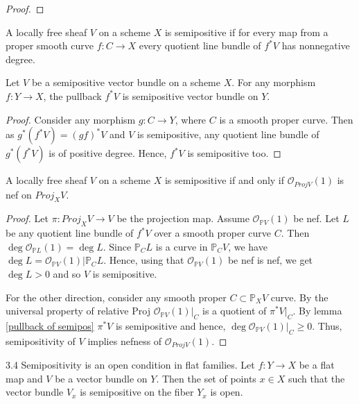 \begin{proof}

\end{proof}


\begin{definition}
A locally free sheaf $V$ on a scheme $X$ is semipositive if for every map from a proper smooth curve $f:C\to X$ every quotient line bundle of $f^*V$ has nonnegative degree.
\end{definition}

\begin{lemma}\label{pullback of semipos}
Let $V$ be a semipositive vector bundle on a scheme $X$. For any morphism $f:Y\to X$, the pullback $f^*V$ is semipositive vector bundle on $Y$.
\end{lemma}
\begin{proof}
Consider any morphism $g:C\to Y$, where $C$ is a smooth proper curve. Then as $g^*(f^*V)=(gf)^*V$ and $V$ is semipositive, any quotient line bundle of  $g^*(f^*V)$ is of positive degree. Hence, $f^*V$ is semipositive too.
\end{proof}

\begin{lemma}\label{semipos=nef}
A locally free sheaf $V$ on a scheme $X$ is semipositive if and only if $\mathcal{O}_{Proj V}(1)$ is nef on $Proj_XV$.
\end{lemma}
\begin{proof}
Let $\pi: Proj_X V\to V$ be the projection map. Assume $\mathcal{O}_{\mathbb{P}V}(1)$ be nef. Let $L$ be  any quotient line bundle of $f^*V$ over a smooth proper curve $C$. Then $\deg \mathcal{O}_{\mathbb{P}L}(1)=\deg L$. Since $\mathbb{P}_CL$ is a curve in $\mathbb{P}_CV$, we have $\deg L=\mathcal{O}_{\mathbb{P}V}(1)|\mathbb{P}_CL$. Hence, using that $\mathcal{O}_{\mathbb{P}V}(1)$ be nef is nef, we get $\deg L>0$ and so $V$ is semipositive.

For the other direction, consider any smooth proper $C\subset \mathbb{P}_XV$ curve. By the universal property of relative Proj $\mathcal{O}_{\mathbb{P}V}(1)|_C$ is a quotient of $\pi^*V|_C$. By lemma \ref{pullback of semipos} $\pi^*V$ is semipositive and hence, $\deg  \mathcal{O}_{\mathbb{P}V}(1)|_C\geq 0$. Thus, semipositivity of $V$ implies nefness of $\mathcal{O}_{Proj V}(1)$.
\end{proof}

\begin{lemma}
3.4 Semipositivity is an open condition in flat families.
Let $f:Y\to X$ be a flat map and $V$ be a vector bundle on $Y$. Then the set of points $x\in X$ such that the vector bundle $V_x$ is semipositive on the fiber $Y_x$ is open.
\end{lemma}

